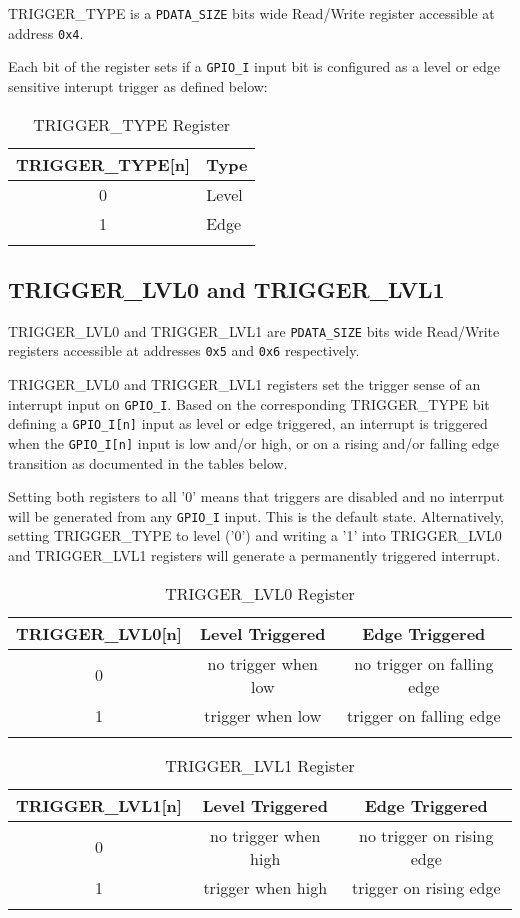 TRIGGER\_TYPE is a \texttt{PDATA\_SIZE} bits wide Read/Write register accessible at address \texttt{0x4}.

Each bit of the register sets if a \texttt{GPIO\_I} input bit is configured as a level or edge sensitive interupt trigger as defined below:

\begin{longtable}[]{@{}cl@{}}
\toprule
\textbf{TRIGGER\_TYPE[n]} & \textbf{Type}\tabularnewline
\midrule
\endhead
0 & Level\tabularnewline
1 & Edge\tabularnewline
\bottomrule
\caption{TRIGGER\_TYPE Register}
\end{longtable}

\subsection{TRIGGER\_LVL0 and TRIGGER\_LVL1}\label{triggermode}

TRIGGER\_LVL0 and TRIGGER\_LVL1 are \texttt{PDATA\_SIZE} bits wide Read/Write registers accessible at addresses \texttt{0x5} and \texttt{0x6} respectively.

TRIGGER\_LVL0 and TRIGGER\_LVL1 registers set the trigger sense of an interrupt input on \texttt{GPIO\_I}.  Based on the corresponding TRIGGER\_TYPE bit defining a \texttt{GPIO\_I[n]} input as level or edge triggered, an interrupt is triggered when the \texttt{GPIO\_I[n]} input is low and/or high, or on a rising and/or falling edge transition as documented in the tables below.

Setting both registers to all '0' means that triggers are disabled and no interrput will be generated from any \texttt{GPIO\_I} input. This is the default state. Alternatively, setting TRIGGER\_TYPE to level ('0') and writing a '1' into TRIGGER\_LVL0 and TRIGGER\_LVL1 registers will generate a permanently triggered interrupt.

\begin{longtable}[]{@{}ccc@{}}
\toprule
\textbf{TRIGGER\_LVL0[n]} & \textbf{Level Triggered} & \textbf{Edge Triggered}\tabularnewline
\midrule
\endhead
0 & no trigger when low & no trigger on falling edge\tabularnewline
1 & trigger when low & trigger on falling edge\tabularnewline
\bottomrule
\caption{TRIGGER\_LVL0 Register}
\end{longtable}

\begin{longtable}[]{@{}ccc@{}}
\toprule
\textbf{TRIGGER\_LVL1[n]} & \textbf{Level Triggered} & \textbf{Edge Triggered}\tabularnewline
\midrule
\endhead
0 & no trigger when high & no trigger on rising edge\tabularnewline
1 & trigger when high & trigger on rising edge\tabularnewline
\bottomrule
\caption{TRIGGER\_LVL1 Register}
\end{longtable}

